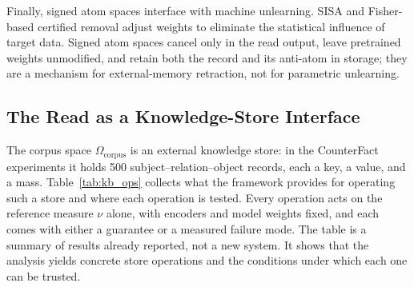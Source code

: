 \documentclass[preprint,12pt]{elsarticle}
\newcommand{\Om}{\Omega}
\newif\ifmarkchanges
\newcommand{\revii}[1]{\ifmarkchanges{\color{blue}#1}\else#1\fi}
\begin{document}
Finally, signed atom spaces interface with machine unlearning. SISA \cite{bourtoule2021machine} and Fisher-based certified removal adjust weights to eliminate the statistical influence of target data. Signed atom spaces cancel only in the read output, leave pretrained weights unmodified, and retain both the record and its anti-atom in storage; they are a mechanism for external-memory retraction, not for parametric unlearning.

\subsection{The Read as a Knowledge-Store Interface}
\label{sec:kb_interface}
\revii{The corpus space $\Om_{\mathrm{corpus}}$ is an external knowledge store: in the CounterFact experiments it holds 500 subject--relation--object records, each a key, a value, and a mass. Table~\ref{tab:kb_ops} collects what the framework provides for operating such a store and where each operation is tested. Every operation acts on the reference measure $\nu$ alone, with encoders and model weights fixed, and each comes with either a guarantee or a measured failure mode. The table is a summary of results already reported, not a new system. It shows that the analysis yields concrete store operations and the conditions under which each one can be trusted.}
\end{document}

